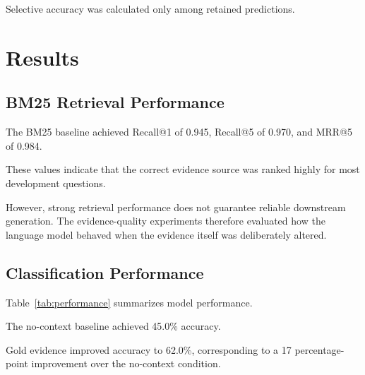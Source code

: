 \documentclass[conference]{IEEEtran}
\begin{document}
Selective accuracy was calculated only among retained predictions.

\section{Results}

\subsection{BM25 Retrieval Performance}

The BM25 baseline achieved Recall@1 of 0.945, Recall@5 of 0.970, and MRR@5 of 0.984.

These values indicate that the correct evidence source was ranked highly for most development questions.

However, strong retrieval performance does not guarantee reliable downstream generation. The evidence-quality experiments therefore evaluated how the language model behaved when the evidence itself was deliberately altered.

\subsection{Classification Performance}

Table~\ref{tab:performance} summarizes model performance.

\begin{table}[t]
\centering
\caption{Performance Across Evidence Conditions}
\label{tab:performance}
\end{table}

The no-context baseline achieved 45.0\% accuracy.

Gold evidence improved accuracy to 62.0\%, corresponding to a 17 percentage-point improvement over the no-context condition.
\end{document}

